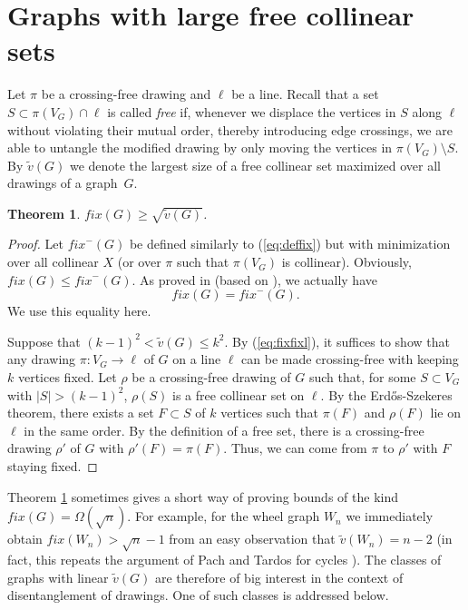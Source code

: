 \documentclass[reqno,12pt]{amsart}
\newcommand{\fix}[1]{\mathit{fix}(#1)}
\newcommand{\free}[1]{\tilde v(#1)}
\newcommand{\fixl}[1]{\mathit{fix}^-(#1)}
\newcommand{\function}[2]{:#1 \rightarrow #2}
\newcommand{\refeq}[1]{(\ref{eq:#1})}
\newtheorem{theorem}{Theorem}[section]
\begin{document}
\section{Graphs with large free collinear sets}\label{s:free}

Let $\pi$ be a crossing-free drawing and $\ell$ be a line.
Recall that a set $S\subset\pi(V_G)\cap\ell$ is called \emph{free} if, 
whenever we displace the vertices in $S$ along $\ell$ without violating 
their mutual order, thereby introducing edge crossings, we are able
to untangle the modified drawing by only moving the vertices in $\pi(V_G)\setminus S$. 
By $\free G$ we denote the largest size
of a free collinear set maximized over all drawings of a graph~$G$.

\begin{theorem}\label{thm:fixfree}
$\fix G\ge\sqrt{\free G}$.
\end{theorem}

\begin{proof}
Let $\fixl G$ be defined similarly to \refeq{deffix} but 
with minimization over all collinear $X$ (or over $\pi$
such that $\pi(V_G)$ is collinear). Obviously, $\fix G\le\fixl G$.
As proved in \cite{KPRSV} (based on \cite[Lemma 1]{Bose}), we actually have
\begin{equation}\label{eq:fixfixl}
\fix G=\fixl G.
\end{equation}
We use this equality here.

Suppose that $(k-1)^2<\free G\le k^2$.
By \refeq{fixfixl}, it suffices to show that any drawing 
$\pi\function{V_G}\ell$ of $G$ on a line $\ell$
can be made crossing-free with keeping $k$ vertices fixed.
Let $\rho$ be a crossing-free drawing of $G$ such that, for some
$S\subset V_G$ with $|S|>(k-1)^2$, $\rho(S)$ is a free collinear set on $\ell$.
By the Erd\H{o}s-Szekeres theorem, there exists a set $F\subset S$ of
$k$ vertices such that $\pi(F)$ and $\rho(F)$ lie on $\ell$ in the same order.
By the definition of a free set, there is a crossing-free drawing $\rho'$
of $G$ with $\rho'(F)=\pi(F)$. Thus, we can come from $\pi$ to $\rho'$ with $F$
staying fixed.
\end{proof}

Theorem \ref{thm:fixfree} sometimes gives a short way of proving
bounds of the kind $\fix G=\Omega(\sqrt n)$. For example, for the wheel graph
$W_n$ we immediately obtain $\fix{W_n}>\sqrt n-1$ from an easy observation
that $\free{W_n}=n-2$ (in fact, this repeats the argument of Pach and Tardos
for cycles \cite{PTa}). The classes of graphs with linear $\free G$ are
therefore of big interest in the context of disentanglement of drawings.
One of such classes is addressed below.
\end{document}

